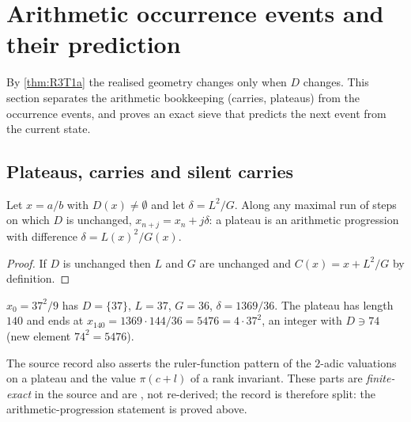 \section{Arithmetic occurrence events and their prediction}\label{sec:events}
By \cref{thm:R3T1a} the realised geometry changes only when $D$ changes. This section separates the arithmetic bookkeeping (carries, plateaus) from the occurrence events, and proves an exact sieve that predicts the next event from the current state.

\subsection{Plateaus, carries and silent carries}
\begin{proposition}\label{prop:BT10}
Let $x=a/b$ with $D(x)\ne\emptyset$ and let $\delta=L^2/G$. Along any maximal run of steps on which $D$ is unchanged, $x_{n+j}=x_n+j\delta$: a plateau is an arithmetic progression with difference $\delta=L(x)^2/G(x)$.
\end{proposition}
\begin{proof}
If $D$ is unchanged then $L$ and $G$ are unchanged and $C(x)=x+L^2/G$ by definition. \qedhere
\end{proof}
\begin{example}\label{ex:plateau}
$x_0=37^2/9$ has $D=\{37\}$, $L=37$, $G=36$, $\delta=1369/36$. The plateau has length $140$ and ends at $x_{140}=1369\cdot144/36=5476=4\cdot37^2$, an integer with $D\ni74$ (new element $74^2=5476$).
\end{example}
\begin{remark}
The source record also asserts the ruler-function pattern of the $2$-adic valuations on a plateau and the value $\pi(c+l)$ of a rank invariant. These parts are \emph{finite-exact} in the source and are , not re-derived; the record is therefore split: the arithmetic-progression statement is proved above.
\end{remark}

